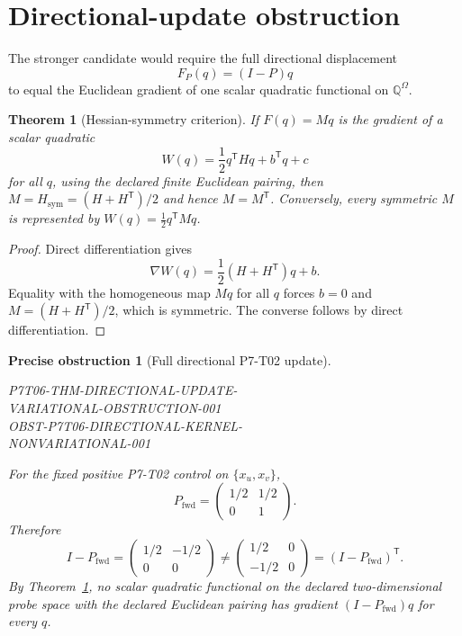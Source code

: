 \documentclass[11pt]{article}
\newtheorem{theorem}{Theorem}
\newtheorem{obstruction}{Precise obstruction}
\newcommand{\Q}{\mathbb Q}
\begin{document}
\section{Directional-update obstruction}

The stronger candidate would require the full directional displacement
\begin{equation}
 F_P(q)=(I-P)q
 \label{eq:directional}
\end{equation}
to equal the Euclidean gradient of one scalar quadratic functional on
\(\Q^\Omega\).

\begin{theorem}[Hessian-symmetry criterion]
\label{thm:hessian}
If \(F(q)=Mq\) is the gradient of a scalar quadratic
\[
 W(q)=\frac12q^{\mathsf T}Hq+b^{\mathsf T}q+c
\]
for all \(q\), using the declared finite Euclidean pairing, then
\(M=H_{\mathrm{sym}}=(H+H^{\mathsf T})/2\) and hence \(M=M^{\mathsf T}\).
Conversely, every symmetric \(M\) is represented by
\(W(q)=\tfrac12q^{\mathsf T}Mq\).
\end{theorem}

\begin{proof}
Direct differentiation gives
\[
 \nabla W(q)=\frac12(H+H^{\mathsf T})q+b.
\]
Equality with the homogeneous map \(Mq\) for all \(q\) forces \(b=0\) and
\(M=(H+H^{\mathsf T})/2\), which is symmetric.  The converse follows by
direct differentiation.
\end{proof}

\begin{obstruction}[Full directional P7-T02 update]
\label{obs:directional}
\begin{center}
\normalfont\small\ttfamily
P7T06-THM-DIRECTIONAL-UPDATE-\\
VARIATIONAL-OBSTRUCTION-001\\[2pt]
OBST-P7T06-DIRECTIONAL-KERNEL-\\
NONVARIATIONAL-001
\end{center}
For the fixed positive P7-T02 control on \(\{x_u,x_v\}\),
\[
 P_{\mathrm{fwd}}
 =
 \begin{pmatrix}
 1/2&1/2\\
 0&1
 \end{pmatrix}.
\]
Therefore
\[
 I-P_{\mathrm{fwd}}
 =
 \begin{pmatrix}
 1/2&-1/2\\
 0&0
 \end{pmatrix}
 \neq
 \begin{pmatrix}
 1/2&0\\
 -1/2&0
 \end{pmatrix}
 =
 (I-P_{\mathrm{fwd}})^{\mathsf T}.
\]
By Theorem~\ref{thm:hessian}, no scalar quadratic functional on the declared
two-dimensional probe space with the declared Euclidean pairing has
gradient \((I-P_{\mathrm{fwd}})q\) for every \(q\).
\end{obstruction}
\end{document}
